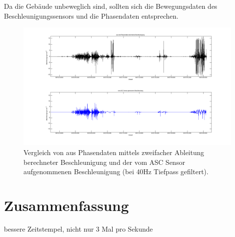 \documentclass[12pt,a4paper]{scrartcl}
\begin{document}
Da die Gebäude unbeweglich sind, sollten sich die Bewegungsdaten des Beschleunigungssensors und die Phasendaten entsprechen. 
 
\begin{figure}[htb]
\centering
\includegraphics[scale=.3]{geoauswertung/a_vs_z.png}
\caption{Vergleich von aus Phasendaten mittels zweifacher Ableitung berechneter Beschleunigung und der vom ASC Sensor aufgenommenen Beschleunigung (bei 40Hz Tiefpass gefiltert).}
\label{a_vs_z}
\end{figure}


\section{Zusammenfassung}



bessere Zeitstempel, nicht nur 3 Mal pro Sekunde

\clearpage
\newpage
\singlespacing
\appendix

%

\end{document}
